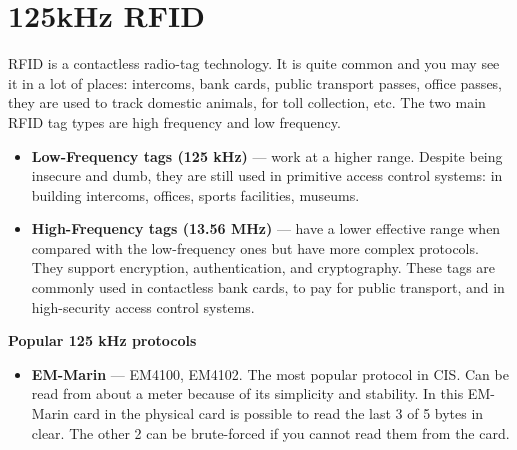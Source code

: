 \documentclass[a4paper,11pt]{report}
\begin{document}
\section{125kHz RFID}
RFID is a contactless radio-tag technology. It is quite common and you may see it in a lot of places: intercoms, bank cards, public transport passes, office passes, they are used to track domestic animals, for toll collection, etc. The two main RFID tag types are high frequency and low frequency.
\begin{itemize}
  \item \textbf{Low-Frequency tags (125 kHz)} — work at a higher range. Despite being insecure and dumb, they are still used in primitive access control systems: in building intercoms, offices, sports facilities, museums.
  \item \textbf{High-Frequency tags (13.56 MHz)} — have a lower effective range when compared with the low-frequency ones but have more complex protocols. They support encryption, authentication, and cryptography. These tags are commonly used in contactless bank cards, to pay for public transport, and in high-security access control systems.
  \end{itemize}
  \textbf{Popular 125 kHz protocols}
  
  \begin{itemize}
    \item \textbf{EM-Marin} — EM4100, EM4102. The most popular protocol in CIS. Can be read from about a meter because of its simplicity and stability. In this EM-Marin card in the physical card is possible to read the last 3 of 5 bytes in clear.
    The other 2 can be brute-forced if you cannot read them from the card.
  \end{itemize}
\end{document}
